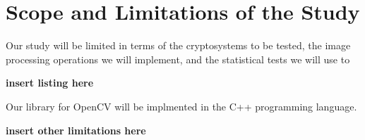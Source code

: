 \section{Scope and Limitations of the Study}

Our study will be limited in terms of the cryptosystems to be tested, the image processing operations we will implement, and the statistical tests we will use to

\textbf{insert listing here}

Our library for OpenCV will be implmented in the C++ programming language.

\textbf{insert other limitations here}
